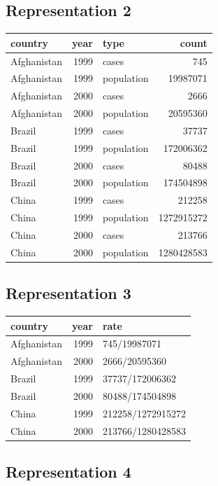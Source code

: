 \documentclass[]{book}
\begin{document}
\subsection{Representation 2}\label{representation-2}

\begin{tabular}{l|r|l|r}
\hline
country & year & type & count\\
\hline
Afghanistan & 1999 & cases & 745\\
\hline
Afghanistan & 1999 & population & 19987071\\
\hline
Afghanistan & 2000 & cases & 2666\\
\hline
Afghanistan & 2000 & population & 20595360\\
\hline
Brazil & 1999 & cases & 37737\\
\hline
Brazil & 1999 & population & 172006362\\
\hline
Brazil & 2000 & cases & 80488\\
\hline
Brazil & 2000 & population & 174504898\\
\hline
China & 1999 & cases & 212258\\
\hline
China & 1999 & population & 1272915272\\
\hline
China & 2000 & cases & 213766\\
\hline
China & 2000 & population & 1280428583\\
\hline
\end{tabular}

\subsection{Representation 3}\label{representation-3}

\begin{tabular}{l|r|l}
\hline
country & year & rate\\
\hline
Afghanistan & 1999 & 745/19987071\\
\hline
Afghanistan & 2000 & 2666/20595360\\
\hline
Brazil & 1999 & 37737/172006362\\
\hline
Brazil & 2000 & 80488/174504898\\
\hline
China & 1999 & 212258/1272915272\\
\hline
China & 2000 & 213766/1280428583\\
\hline
\end{tabular}

\subsection{Representation 4}\label{representation-4}
\end{document}
